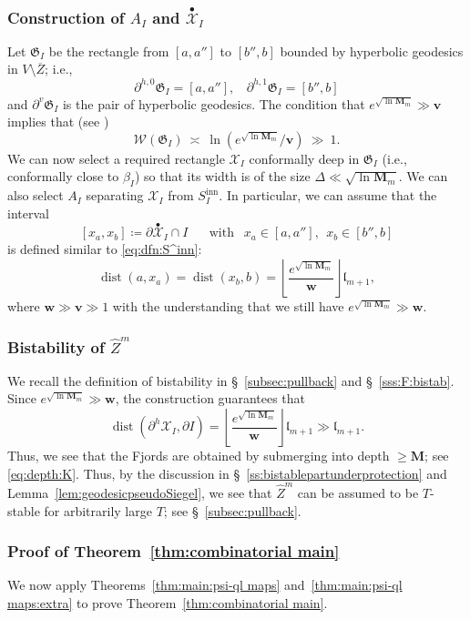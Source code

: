 \documentclass{amsart}
\renewcommand{\sp}{{\ \ }}
\newcommand{\1}{{\mathbb 1 }}
\newcommand{\upbullet}[1]{\overset{\bullet}{ #1}{}}
\newcommand{\Width}{{\mathcal W}}
\newcommand{\bbv}{{\mathbf{v}}}
\newcommand\XX{\mathcal{X}}
\newcommand{\bM}{{\mathbf M}}
\newcommand{\wZ}{{\widehat Z}}
\newcommand{\bbw}{{\mathbf w}}
\newcommand{\length}{{\mathfrak l}}
\newcommand\inn{{\operatorname{inn}}}
\theoremstyle{remark}
\numberwithin{equation}{section}
\theoremstyle{definition}
\newcommand{\dist}{\operatorname{dist}}
\begin{document}
\subsubsection{Construction of $A_I$ and $\upbullet \XX_I$}
Let $\mathfrak G_I$ be the rectangle from $[a,a'']$ to $[b'', b]$ bounded by hyperbolic geodesics in $V\setminus \overline Z$; i.e., 
\[ \partial^{h,0} \mathfrak G_I =[a,a''],\sp\sp \partial^{h,1} \mathfrak G_I =[b'',b]\]
and $\partial^{v}\mathfrak G_I $ is the pair of hyperbolic geodesics. The condition that $e^{\sqrt{ \ln \bM_{m}}} \gg \bbv$ implies that (see \cite[\S 4]{DL22})\[ \Width (\mathfrak G_I) \ \asymp\  \ln \left(e^{\sqrt{ \ln \bM_{m}}}/\bbv \right) \ \gg \ 1.\]
We can now select a required rectangle $\XX_I$ conformally deep in $\mathfrak G_I$ (i.e., conformally close to $\beta_I$) so that its width is of the size $\Delta \ll  \sqrt{ \ln \bM_{m}}$. We can also select $A_I$ separating $\XX_I$ from $S^\inn_I$. In particular, we can assume that the interval \[[x_a, x_b]\coloneqq \partial \upbullet \XX_I \cap I\sp\sp\sp\text{ with }\sp x_a\in[a,a''], \sp x_b\in [b'', b]\]
is defined similar to \eqref{eq:dfn:S^inn}:
\[     \dist(a, x_a)=\dist(x_b,b) =\left\lfloor \frac{e^{\sqrt{ \ln \bM_{m}}}}{ \bbw}\right\rfloor \length_{m+1}, \]
where $\bbw \gg \bbv\gg 1$ with the understanding that we still have $e^{\sqrt{ \ln \bM_{m}}}\gg \bbw$.




\subsubsection{Bistability of ${\wZ^m}$} \label{sss:big:bistability}
We recall the definition of bistability in \S~\ref{subsec:pullback} and \S~\ref{sss:F:bistab}. Since $e^{\sqrt{ \ln \bM_{m}}}\gg \bbw$, the construction guarantees that 
$$
\dist(\partial^h \XX_I, \partial I) = \left\lfloor \frac{e^{\sqrt{ \ln \bM_{m}}}}{ \bbw}\right\rfloor \length_{m+1} \gg \length_{m+1}.
$$
Thus, we see that the Fjords are obtained by submerging into depth $\geq \bM$; see \eqref{eq:depth:K}.
Thus, by the discussion in \S~\ref{ss:bistablepartunderprotection} and Lemma~\ref{lem:geodesicpseudoSiegel}, we see that ${\wZ^m}$ can be assumed to be $T$-stable for arbitrarily large $T$; see \S~\ref{subsec:pullback}.

\subsubsection{Proof of Theorem~\ref{thm:combinatorial main}}
We now apply Theorems~\ref{thm:main:psi-ql maps} and~\ref{thm:main:psi-ql maps:extra} to prove Theorem~\ref{thm:combinatorial main}.
\end{document}
